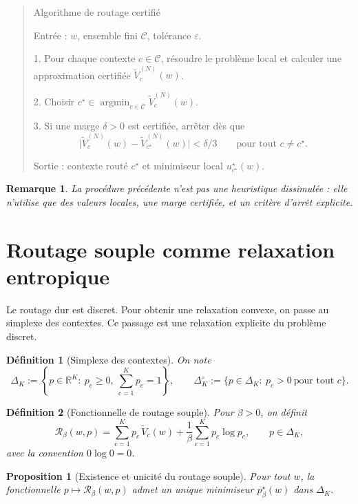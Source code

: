 \documentclass[11pt,a4paper]{article}
\newtheorem{definition}{Définition}[section]
\newtheorem{proposition}{Proposition}[section]
\newtheorem{remark}{Remarque}[section]
\DeclareMathOperator{\argmin}{argmin}
\newcommand{\R}{\mathbb R}
\newcommand{\Ccal}{\mathcal C}
\newcommand{\Rcal}{\mathcal R}
\begin{document}
\begin{quote}
\small
Algorithme de routage certifié

Entrée : \(w\), ensemble fini \(\Ccal\), tolérance \(\varepsilon\).

1. Pour chaque contexte \(c\in\Ccal\), résoudre le problème local et calculer une approximation certifiée \(\widetilde V_c^{(N)}(w)\).

2. Choisir \(c^\star\in\argmin_{c\in\Ccal}\widetilde V_c^{(N)}(w)\).

3. Si une marge \(\delta>0\) est certifiée, arrêter dès que
\[
\bigl|\widetilde V_c^{(N)}(w)-\widetilde V_{c^\star}^{(N)}(w)\bigr|<\delta/3
\qquad\text{pour tout }c\neq c^\star.
\]

Sortie : contexte routé \(c^\star\) et minimiseur local \(u_{c^\star}^\star(w)\).
\end{quote}

\begin{remark}
La procédure précédente n'est pas une heuristique dissimulée : elle n'utilise que des valeurs locales, une marge certifiée, et un critère d'arrêt explicite.
\end{remark}

\section{Routage souple comme relaxation entropique}

Le routage dur est discret. Pour obtenir une relaxation convexe, on passe au simplexe des contextes. Ce passage est une relaxation explicite du problème discret.

\begin{definition}[Simplexe des contextes]
On note
\[
\Delta_K:=\left\{p\in\R^K:\ p_c\ge 0,\ \sum_{c=1}^K p_c=1\right\},
\qquad
\Delta_K^\circ:=\{p\in\Delta_K:\ p_c>0\ \text{pour tout }c\}.
\]
\end{definition}

\begin{definition}[Fonctionnelle de routage souple]
Pour \(\beta>0\), on définit
\[
\Rcal_\beta(w,p)
=
\sum_{c=1}^K p_c\,\widetilde V_c(w)
+\frac{1}{\beta}\sum_{c=1}^K p_c\log p_c,
\qquad p\in\Delta_K,
\]
avec la convention \(0\log 0=0\).
\end{definition}

\begin{proposition}[Existence et unicité du routage souple]
Pour tout \(w\), la fonctionnelle \(p\mapsto \Rcal_\beta(w,p)\) admet un unique minimiseur \(p^\star_\beta(w)\) dans \(\Delta_K\).
\end{proposition}
\end{document}
